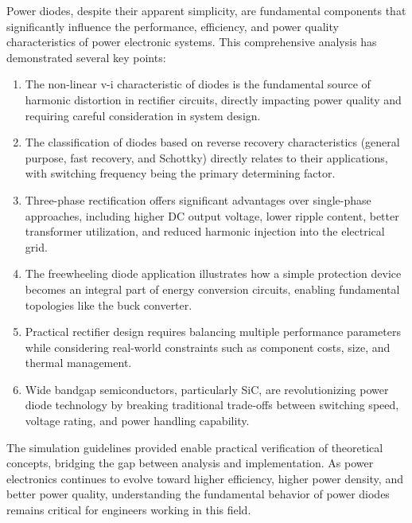 \documentclass[12pt,a4paper]{article}
\begin{document}
Power diodes, despite their apparent simplicity, are fundamental components that significantly influence the performance, efficiency, and power quality characteristics of power electronic systems. This comprehensive analysis has demonstrated several key points:

\begin{enumerate}
    \item The non-linear v-i characteristic of diodes is the fundamental source of harmonic distortion in rectifier circuits, directly impacting power quality and requiring careful consideration in system design.
    
    \item The classification of diodes based on reverse recovery characteristics (general purpose, fast recovery, and Schottky) directly relates to their applications, with switching frequency being the primary determining factor.
    
    \item Three-phase rectification offers significant advantages over single-phase approaches, including higher DC output voltage, lower ripple content, better transformer utilization, and reduced harmonic injection into the electrical grid.
    
    \item The freewheeling diode application illustrates how a simple protection device becomes an integral part of energy conversion circuits, enabling fundamental topologies like the buck converter.
    
    \item Practical rectifier design requires balancing multiple performance parameters while considering real-world constraints such as component costs, size, and thermal management.
    
    \item Wide bandgap semiconductors, particularly SiC, are revolutionizing power diode technology by breaking traditional trade-offs between switching speed, voltage rating, and power handling capability.
\end{enumerate}

The simulation guidelines provided enable practical verification of theoretical concepts, bridging the gap between analysis and implementation. As power electronics continues to evolve toward higher efficiency, higher power density, and better power quality, understanding the fundamental behavior of power diodes remains critical for engineers working in this field.
\end{document}

